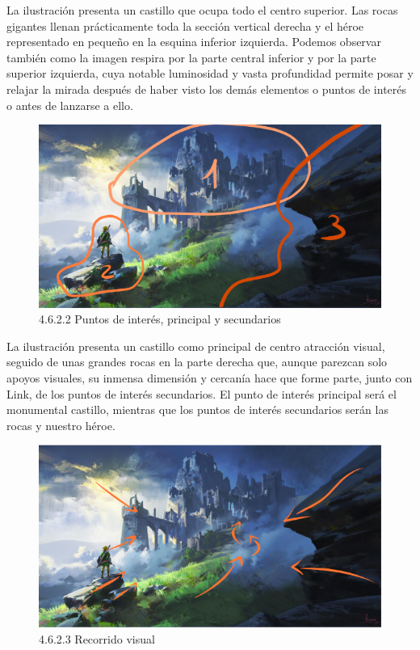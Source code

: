\documentclass[12pt]{article}
\begin{document}
    La ilustración presenta un castillo que ocupa todo el centro superior. Las rocas gigantes llenan prácticamente toda la sección vertical derecha y el héroe representado en pequeño en la esquina inferior izquierda. Podemos observar también como la imagen respira por la parte central inferior y por la parte superior izquierda, cuya notable luminosidad y vasta profundidad permite posar y relajar la mirada después de haber visto los demás elementos o puntos de interés o antes de lanzarse a ello.

    \begin{figure}[H]
      \centering
      \includegraphics[width=\textwidth]{images/Nerea/Nerea Zelda concept 622.PNG}
      \caption{\small 4.6.2.2 Puntos de interés, principal y secundarios}
    \end{figure}

    La ilustración presenta un castillo como principal de centro atracción visual, seguido de unas grandes rocas en la parte derecha que, aunque parezcan solo apoyos visuales, su inmensa dimensión y cercanía hace que forme parte, junto con Link, de los puntos de interés secundarios. El punto de interés principal será el monumental castillo, mientras que los puntos de interés secundarios serán las rocas y nuestro héroe.

    \begin{figure}[H]
      \centering
      \includegraphics[width=\textwidth]{images/Nerea/Nerea Zelda concept 623.PNG}
      \caption{\small 4.6.2.3 Recorrido visual}
    \end{figure}
\end{document}
